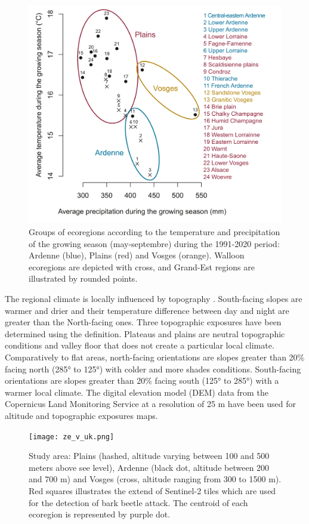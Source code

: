 \documentclass[3p,procedia]{elsarticle}
\begin{document}
\begin{figure}[htbp] 
	\centering
	\includegraphics[width=0.8\linewidth]{climat/climat_region.png}
	\caption{Groups of ecoregions according to the temperature and precipitation of the growing season (may-septembre) during the 1991-2020 period: Ardenne (blue), Plains (red) and Vosges (orange). Walloon ecoregions are depicted with cross, and Grand-Est regions are illustrated by rounded points.}
	\label{fig:clim}
\end{figure}

The regional climate is locally influenced by topography \citep{de_frenne_forest_2021}.
South-facing slopes are warmer and drier and their temperature difference between day and night are greater than the North-facing ones.
Three topographic exposures have been determined using the \cite{Delvaux_galoux} definition.
Plateaus and plains are neutral topographic conditions and valley floor that does not create a particular local climate.
Comparatively to flat areas, north-facing orientations are slopes greater than  20\% facing north (285° to 125°) with colder and more shades conditions.
South-facing orientations are slopes greater than  20\% facing south (125° to 285°) with a warmer local climate.
The digital elevation model (DEM) data from the Copernicus Land Monitoring Service \citep{DEM_copernicus} at a resolution of 25 m have been used for altitude and topographic exposures maps.

\begin{figure} [htbp] 
	\centering
	\texttt{[image: ze\_v\_uk.png]}
	\caption{Study area: Plains (hashed, altitude varying between 100 and 500 meters above see level), Ardenne (black dot, altitude between 200 and 700 m) and Vosges (cross, altitude ranging from 300 to 1500 m). Red squares illustrates the extend of Sentinel-2 tiles which are used for the detection of bark beetle attack. The centroid of each ecoregion is represented by purple dot.}
	\label{fig:situ}
\end{figure}
\end{document}
